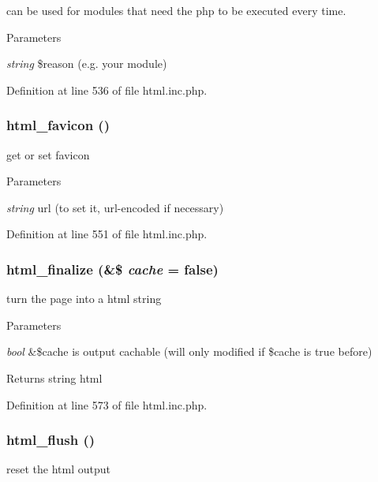 can be used for modules that need the php to be executed every time. 
\begin{DoxyParams}{Parameters}
\item[{\em string}]\$reason (e.g. your module) \end{DoxyParams}


Definition at line 536 of file html.inc.php.

\hypertarget{html_8inc_8php_a5738adf9b56d1ff2b8d02977ed7929ce}{
\subsubsection[{html\_\-favicon}]{\setlength{\rightskip}{0pt plus 5cm}html\_\-favicon ()}}
\label{html_8inc_8php_a5738adf9b56d1ff2b8d02977ed7929ce}
get or set favicon


\begin{DoxyParams}{Parameters}
\item[{\em string}]url (to set it, url-\/encoded if necessary) \end{DoxyParams}


Definition at line 551 of file html.inc.php.

\hypertarget{html_8inc_8php_a405dc7e3718d4196c05087057ebf69bf}{
\subsubsection[{html\_\-finalize}]{\setlength{\rightskip}{0pt plus 5cm}html\_\-finalize (\&\$ {\em cache} = {\ttfamily false})}}
\label{html_8inc_8php_a405dc7e3718d4196c05087057ebf69bf}
turn the page into a html string


\begin{DoxyParams}{Parameters}
\item[{\em bool}]\&\$cache is output cachable (will only modified if \$cache is true before) \end{DoxyParams}
\begin{DoxyReturn}{Returns}
string html 
\end{DoxyReturn}


Definition at line 573 of file html.inc.php.

\hypertarget{html_8inc_8php_af8cd696bd10c945b09dae962d549b75b}{
\subsubsection[{html\_\-flush}]{\setlength{\rightskip}{0pt plus 5cm}html\_\-flush ()}}
\label{html_8inc_8php_af8cd696bd10c945b09dae962d549b75b}
reset the html output 

